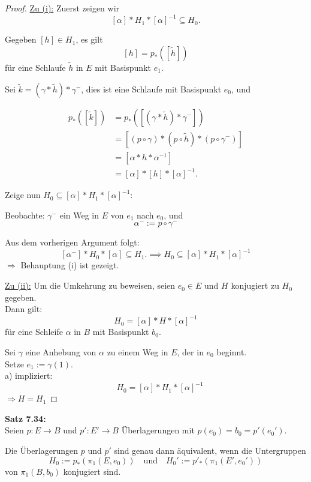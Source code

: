 \documentclass[fleqn, 12pt, letterpaper]{article}
\begin{document}
\begin{proof}
\underline{Zu (i):} Zuerst zeigen wir 
\[
[\alpha] * H_1 * [\alpha]^{-1} \subseteq H_0.
\]

Gegeben \([h] \in H_1\), es gilt 
\[
[h] = p_*([\widetilde{h}])
\]
für eine Schlaufe \(\widetilde{h}\) in \(E\) mit Basispunkt \(e_1\).

Sei \(\tilde{k} = (\gamma * \widetilde{h}) * \gamma^-\), dies ist eine Schlaufe mit Basispunkt \(e_0\), und

\begin{align*}
p_*([\tilde{k}]) 
&= p_*\left([(\gamma * \widetilde{h}) * \gamma^-]\right) \\
&= \left[(p \circ \gamma) * (p \circ \widetilde{h}) * (p \circ \gamma^-)\right] \\
&= [\alpha * h * \alpha^{-1}] \\
&= [\alpha] * [h] * [\alpha]^{-1}.
\end{align*}

Zeige nun $H_0\subseteq[\alpha]*H_1*[\alpha]^{-1}$:

Beobachte:  \( \gamma^{-} \) ein Weg in \( E \) von \( e_1 \) nach \( e_0 \), und
\[
\alpha^{-} := p \circ \gamma^{-}
\]

Aus dem vorherigen Argument folgt:
\[
[\alpha^-]*H_0*[\alpha]\subseteq H_1. \implies H_0\subseteq[\alpha]*H_1*[\alpha]^{-1}
\]
$\Rightarrow$ {Behauptung} (i) ist gezeigt. 

\vspace{1em}
\underline{Zu (ii):} Um die Umkehrung zu beweisen, seien \( e_0 \in E \) und \( H \) konjugiert zu \( H_0 \) gegeben. \\
Dann gilt:
\[
H_0 = [\alpha]* H* [\alpha]^{-1}
\]
für eine Schleife \( \alpha \) in \( B \) mit Basispunkt \( b_0 \).

Sei \( \gamma \) eine Anhebung von \( \alpha \) zu einem Weg in \( E \), der in \( e_0 \) beginnt. \\
Setze \( e_1 := \gamma(1) \). \\
a) impliziert:
\[
 \quad H_0=[\alpha]* H_1* [\alpha]^{-1}
\]
$\Rightarrow H=H_1$ 

\end{proof}

\textbf{Satz 7.34:} \\
Seien \( p : E \to B \) und \( p' : E' \to B \) Überlagerungen mit \( p(e_0) = b_0 = p'(e_0') \).

Die Überlagerungen \( p \) und \( p' \) sind genau dann äquivalent, wenn die Untergruppen
\[
H_0 := p_* \left( \pi_1(E, e_0) \right) \quad \text{und} \quad H_0' := p'_* \left( \pi_1(E', e_0') \right)
\]
von \( \pi_1(B, b_0) \) konjugiert sind.
\end{document}
